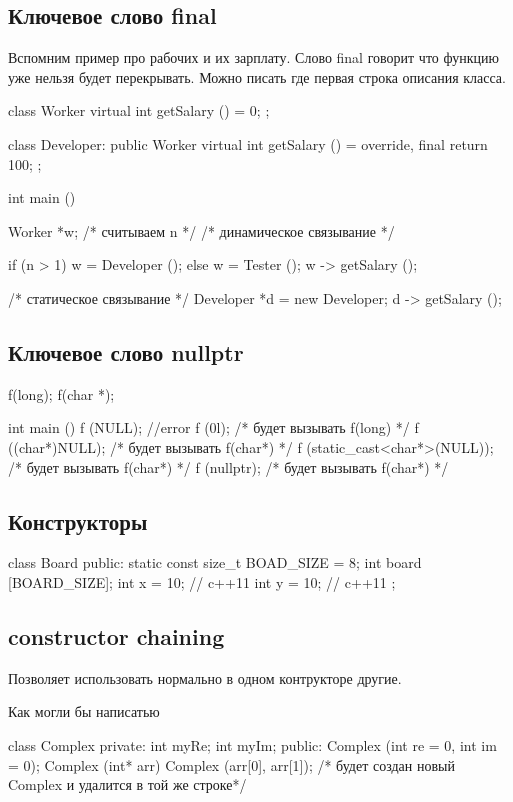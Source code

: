 \subsection{Ключевое слово final}
Вспомним пример про рабочих и их зарплату. 
Слово final говорит что функцию уже нельзя будет перекрывать.
Можно писать где первая строка описания класса. 
\begin{cppcode}

class Worker {
	virtual int getSalary () = 0; 
};

class Developer: public Worker {
	virtual int getSalary () = override, final {
		return 100;
	}	
};

int main () {
	Worker *w; 
	/* считываем n */
	/* динамическое связывание */

	if (n > 1) 
		w = Developer (); 
	else
		w = Tester ();
	w -> getSalary ();

	/* статическое связывание */
	Developer *d = new Developer;
	d -> getSalary ();
}
\end{cppcode}


\subsection{Ключевое слово nullptr}
\begin{cppcode}
f(long);
f(char *);

int main () {
	f (NULL); //error
	f (0l); /* будет вызывать f(long) */
	f ((char*)NULL); /* будет вызывать f(char*) */
	f (static_cast<char*>(NULL)); /* будет вызывать f(char*) */
	f (nullptr); /* будет вызывать f(char*) */
}
\end{cppcode}

\subsection{Конструкторы}
\begin{cppcode}
class Board {
public:
	static const size_t BOAD_SIZE = 8;
	int board [BOARD_SIZE];
	int x = 10; // c++11
	int y = 10; // c++11
};
\end{cppcode}

\subsection{constructor chaining}
Позволяет использовать нормально в одном контрукторе другие.

Как могли бы написатью
\begin{cppcode}
class Complex {
private:
	int myRe;
	int myIm;
public:
	Complex (int re = 0, int im = 0);
	Complex (int* arr) {
		Complex (arr[0], arr[1]);
		/* будет создан новый Complex и удалится в той же строке*/
	}
}
\end{cppcode}

